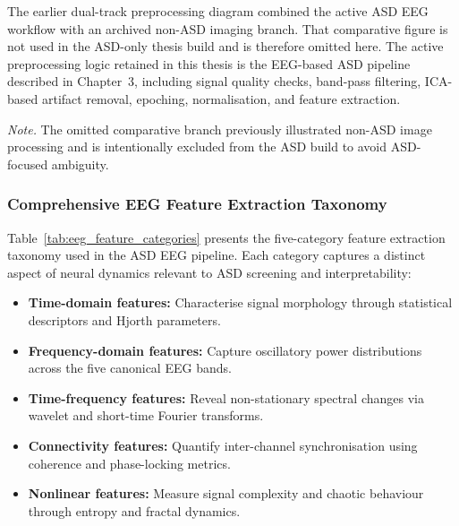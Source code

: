\label{fig:preproc_pipeline}
The earlier dual-track preprocessing diagram combined the active ASD EEG workflow with an archived non-ASD imaging branch. That comparative figure is not used in the ASD-only thesis build and is therefore omitted here. The active preprocessing logic retained in this thesis is the EEG-based ASD pipeline described in Chapter~3, including signal quality checks, band-pass filtering, ICA-based artifact removal, epoching, normalisation, and feature extraction.

\noindent\textit{Note.} The omitted comparative branch previously illustrated non-ASD image processing and is intentionally excluded from the ASD build to avoid ASD-focused ambiguity.



\subsubsection{Comprehensive EEG Feature Extraction Taxonomy}
\label{sec:eeg_feature_taxonomy}

Table~\ref{tab:eeg_feature_categories} presents the five-category feature extraction taxonomy used in the ASD EEG pipeline. Each category captures a distinct aspect of neural dynamics relevant to ASD screening and interpretability:

\begin{itemize}[leftmargin=*, itemsep=3pt]
    \item \textbf{Time-domain features:} Characterise signal morphology through statistical descriptors and Hjorth parameters.
    \item \textbf{Frequency-domain features:} Capture oscillatory power distributions across the five canonical EEG bands.
    \item \textbf{Time-frequency features:} Reveal non-stationary spectral changes via wavelet and short-time Fourier transforms.
    \item \textbf{Connectivity features:} Quantify inter-channel synchronisation using coherence and phase-locking metrics.
    \item \textbf{Nonlinear features:} Measure signal complexity and chaotic behaviour through entropy and fractal dynamics.
\end{itemize}

